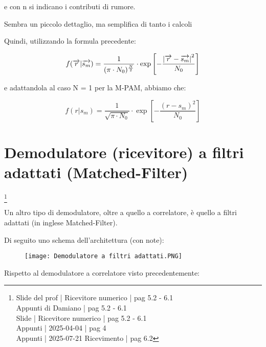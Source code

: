 e con n si indicano i contributi di rumore. \newline 

\begin{tcolorbox}
    Sembra un piccolo dettaglio, ma semplifica di tanto i calcoli
\end{tcolorbox} 

Quindi, utilizzando la formula precedente: 

{
    \Large 
    \begin{equation}
         f (\overrightarrow{r} | \overrightarrow{s_m})
        =
        \frac{1}{(\pi \cdot N_0)^{\frac{N}{2}}}
        \cdot 
        \exp \left[- \frac{\abs{\overrightarrow{r} - \overrightarrow{s_m}}^{2}}{N_0} \right]
    \end{equation}
}

e adattandola al caso N = 1 per la M-PAM, abbiamo che: 

{
    \Large 
    \begin{equation}
        f (r | s_m)
        = 
        \frac{1}{\sqrt{\pi \cdot N_0}}
        \cdot 
        \exp \left[ - \frac{(r - s_m)^{2}}{N_0}\right]
    \end{equation}
}

\newpage 

\section{Demodulatore (ricevitore) a filtri adattati (Matched-Filter)}
\footnote{Slide del prof | Ricevitore numerico | pag 5.2 - 6.1 \\  
Appunti di Damiano | pag 5.2 - 6.1\\
Slide | Ricevitore numerico | pag 5.2 - 6.1 \\
Appunti | 2025-04-04 | pag 4 \\ 
Appunti | 2025-07-21 Ricevimento | pag 6.2
}

Un altro tipo di demodulatore, oltre a quello a correlatore, 
è quello a filtri adattati (in inglese Matched-Filter). \newline 

Di seguito uno schema dell'architettura (con note): 

\begin{figure}[h]
    \centering
    \texttt{[image: Demodulatore a filtri adattati.PNG]}
\end{figure}

Rispetto al demodulatore a correlatore visto precedentemente: 

